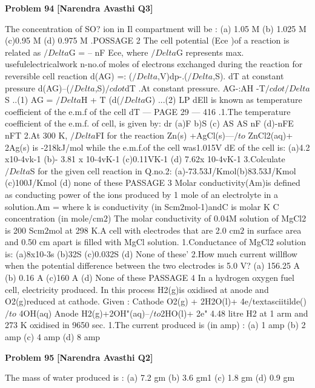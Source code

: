 \begin{problembox}
\textbf{Problem 94} \hfill \textbf{[Narendra Avasthi Q3]}
\label{q:ext-narendra_avasthi_all_questions-94}

The concentration of SO? ion in Il compartment will be :
(a) 1.05 M
(b) 1.025 M
(c)0.95 M
(d) 0.975 M
.POSSAGE
2
The cell potential (Ece )of a reaction is related as $/Delta$G = -- nF Ece, where $/Delta$G represents max.
usefulelectricalwork
n-no.of moles of electrons exchanged during the reaction
for reversible cell reaction d(AG) =: ($/Delta$,V)dp-.($/Delta$,S). dT
at constant pressure
d(AG)--($/Delta$,S)$/cdot$dT
.At constant pressure.
AG-:AH -T$/cdot$$/Delta$S
..(1)
AG = $/Delta$H + T
(d($/Delta$G)
...(2)
LP
dEll
is known as temperature coefficient of the e.m.f of the cell
dT
--- PAGE 29 ---
416
.1.The temperature coefficient of the e.m.f. of cell,
is given by:
dr
(a)F
b)S
(c)
AS
AS
nF
(d)-nFE
nFT
2.At 300 K, $/Delta$FI for the reaction
Zn(s) +AgCl(s)---$/to$ ZnCl2(aq)+ 2Ag(s) is
-218kJ/mol while the e.m.f.of the cell was1.015V
dE
of the cell is:
(a)4.2 x10-4vk-1
(b)- 3.81 x 10-4vK-1
(c)0.11VK-1
(d) 7.62x 10-4vK-1
3.Colculate$/Delta$S for the given cell reaction in Q.no.2:
(a)-73.53J/Kmol(b)83.53J/Kmol
(c)100J/Kmol
(d) none of these
PASSAGE
3
Molar conductivity(Am)is defined as conducting power of the ions produced by 1 mole of
an electrolyte in a solution.Am =
where k is conductivity (in Scm$2$mol-1)andC is molar
K
C
concentration (in mole/cm$2$)
The molar conductivity of 0.04M solution of MgCl2 is 200 Scm$2$mol at 298 K.A cell with
electrodes that are 2.0 cm$2$ in surface area and 0.50 cm apart is filled with MgCl solution.
1.Conductance of MgCl2 solution is:
(a)8x10-3s
(b)32S
(c)0.032S
(d) None of these'
2.How much current willflow when the potential difference between the two electrodes is 5.0 V?
(a) 156.25 A
(b) 0.16 A
(c)160 A
(d) None of these
PASSAGE
4
In a hydrogen oxygen fuel cell, electricity produced. In this process H2(g)is oxidised at anode
and O2(g)reduced at cathode.
Given : Cathode O2(g) + 2H2O(l)+ 4e/textasciitilde()$/to$ 4OH(aq)
Anode
H2(g)+2OH"(aq)--$/to$2HO(l)+ 2e"
4.48 litre H2 at 1 arm and 273 K oxidised in 9650 sec.
1.The current produced is (in amp) :
(a) 1 amp
(b) 2 amp
(c) 4 amp
(d) 8 amp
\end{problembox}

\begin{problembox}
\textbf{Problem 95} \hfill \textbf{[Narendra Avasthi Q2]}
\label{q:ext-narendra_avasthi_all_questions-95}

The mass of water produced is :
(a) 7.2 gm
(b) 3.6 gm1
(c) 1.8 gm
(d) 0.9 gm
\end{problembox}

